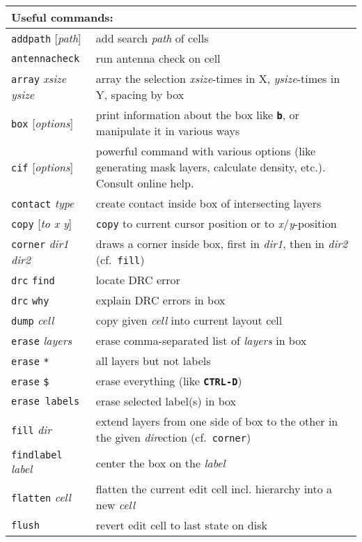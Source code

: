 \documentclass[10pt,a4paper]{article}
\newcommand{\key}[1]{\texttt{\textbf{#1}}}
\newcommand{\mac}[1]{\texttt{#1}}
\newcommand{\argu}[1]{\textit{#1}}
\begin{document}
	\begin{tabular}{p{}p{}}
		\toprule
		\multicolumn{2}{l}{Useful commands:}\\
		\midrule
		\mac{addpath} [\argu{path}] & add search \argu{path} of cells\\
		\mac{antennacheck} & run antenna check on cell\\
		\mac{array} \argu{xsize} \argu{ysize} & array the selection \argu{xsize}-times in X, \argu{ysize}-times in Y, spacing by box\\
		\mac{box} [\argu{options}] & print information about the box like \key{b}, or manipulate it in various ways\\
		\mac{cif} [\argu{options}] & powerful command with various options (like generating mask layers, calculate density, etc.). Consult online help.\\
		\mac{contact} \argu{type} & create contact inside box of intersecting layers\\
		\mac{copy} [\argu{to x y}] & \mac{copy} to current cursor position or to \argu{x}/\argu{y}-position\\
		\mac{corner} \argu{dir1} \argu{dir2} & draws a corner inside box, first in \argu{dir1}, then in \argu{dir2} (cf.~\mac{fill})\\
		\mac{drc} \mac{find} & locate DRC error\\
		\mac{drc} \mac{why} & explain DRC errors in box\\
		\mac{dump} \argu{cell} & copy given \argu{cell} into current layout cell\\
		\mac{erase} \argu{layers} & erase comma-separated list of \argu{layers} in box\\
		\mac{erase} \mac{*} & all layers but not labels\\
		\mac{erase} \mac{\$} & erase everything (like \key{CTRL-D})\\
		\mac{erase labels} & erase selected label(s) in box\\
		\mac{fill} \argu{dir} & extend layers from one side of box to the other in the given \argu{dir}ection (cf.~\mac{corner})\\
		\mac{findlabel} \argu{label} & center the box on the \argu{label}\\
		\mac{flatten} \argu{cell} & flatten the current edit cell incl. hierarchy into a new \argu{cell}\\
		\mac{flush} & revert edit cell to last state on disk\\

\end{tabular}
\end{document}
